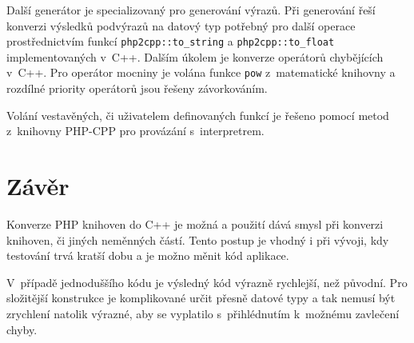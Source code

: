 \documentclass[czech]{ExcelAtFIT}
\newcommand{\function}[1]{\texttt{#1}}
\begin{document}
	Další generátor je specializovaný pro generování výrazů. Při generování řeší konverzi výsledků pod\-vý\-ra\-zů na datový typ potřebný pro další operace pro\-střed\-nic\-tvím funkcí \function{php2cpp::to\_string} a \function{php2\-cpp\-::to\_\-float} implementovaných v~C++. Dalším ú\-ko\-lem je konverze operátorů chybějících v~C++. Pro operátor mocniny je volána funkce \function{pow} z~matematické knihovny a rozdílné priority operátorů jsou řešeny zá\-vor\-ko\-vá\-ním.

	Volání vestavěných, či uživatelem definovaných funkcí je řešeno pomocí metod z~knihovny PHP-CPP pro provázání s~interpretrem.









\section{Závěr}
\label{sec:Conclusions}


	Konverze PHP knihoven do C++ je možná a použití dává smysl při konverzi knihoven, či jiných neměnných částí. Tento postup je vhodný i při vývoji, kdy testování trvá kratší dobu a je možno měnit kód aplikace.



	V~případě jednoduššího kódu je výsledný kód vý\-raz\-ně rychlejší, než původní. Pro složitější konstrukce je komplikované určit přesně datové typy a tak nemusí být zrychlení natolik výrazné, aby se vyplatilo s~přihlédnutím k~možnému zavlečení chyby.
\end{document}
